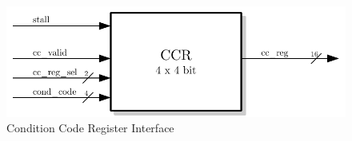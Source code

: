 \begin{figure}[htb]
 \centering
 \includegraphics[scale=1.0]{images/ccr_blackbox}
 \caption{Condition Code Register Interface}
\label{fig:ccr_inf}
\end{figure}




